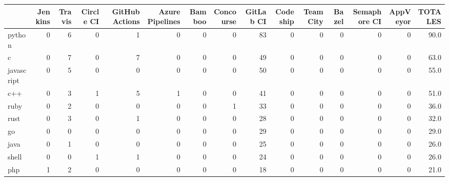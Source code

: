 \begin{tabular}{lrrrrrrrrrrrrrr}
\toprule
{} &  Jenkins &  Travis &  Circle CI &  GitHub Actions &  Azure Pipelines &  Bamboo &  Concourse &  GitLab CI &  Codeship &  TeamCity &  Bazel &  Semaphore CI &  AppVeyor &  TOTALES \\
\midrule
python           &        0 &       6 &          0 &               1 &                0 &       0 &          0 &         83 &         0 &         0 &      0 &             0 &         0 &     90.0 \\
c                &        0 &       7 &          0 &               7 &                0 &       0 &          0 &         49 &         0 &         0 &      0 &             0 &         0 &     63.0 \\
javascript       &        0 &       5 &          0 &               0 &                0 &       0 &          0 &         50 &         0 &         0 &      0 &             0 &         0 &     55.0 \\
c++              &        0 &       3 &          1 &               5 &                1 &       0 &          0 &         41 &         0 &         0 &      0 &             0 &         0 &     51.0 \\
ruby             &        0 &       2 &          0 &               0 &                0 &       0 &          1 &         33 &         0 &         0 &      0 &             0 &         0 &     36.0 \\
rust             &        0 &       3 &          0 &               1 &                0 &       0 &          0 &         28 &         0 &         0 &      0 &             0 &         0 &     32.0 \\
go               &        0 &       0 &          0 &               0 &                0 &       0 &          0 &         29 &         0 &         0 &      0 &             0 &         0 &     29.0 \\
java             &        0 &       1 &          0 &               0 &                0 &       0 &          0 &         25 &         0 &         0 &      0 &             0 &         0 &     26.0 \\
shell            &        0 &       0 &          1 &               1 &                0 &       0 &          0 &         24 &         0 &         0 &      0 &             0 &         0 &     26.0 \\
php              &        1 &       2 &          0 &               0 &                0 &       0 &          0 &         18 &         0 &         0 &      0 &             0 &         0 &     21.0 \\

\end{tabular}
